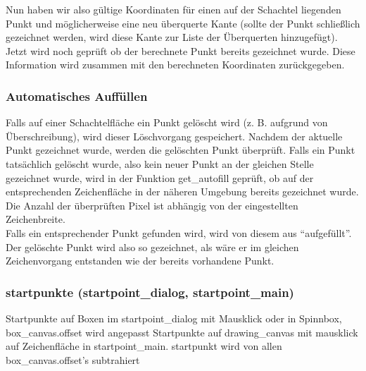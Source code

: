 Nun haben wir also gültige Koordinaten für einen auf der Schachtel liegenden Punkt und möglicherweise eine neu überquerte Kante (sollte der Punkt schließlich gezeichnet werden, wird diese Kante zur Liste der Überquerten hinzugefügt). Jetzt wird noch geprüft ob der berechnete Punkt bereits gezeichnet wurde. Diese Information wird zusammen mit den berechneten Koordinaten zurückgegeben.\\


\subsubsection{Automatisches Auffüllen}
\label{subsubsec:auffuellen}

Falls auf einer Schachtelfläche ein Punkt gelöscht wird (z. B. aufgrund von Überschreibung), wird dieser Löschvorgang gespeichert. Nachdem der aktuelle Punkt gezeichnet wurde, werden die gelöschten Punkt überprüft. Falls ein Punkt tatsächlich gelöscht wurde, also kein neuer Punkt an der gleichen Stelle gezeichnet wurde, wird in der Funktion get\_autofill geprüft, ob auf der entsprechenden Zeichenfläche in der näheren Umgebung bereits gezeichnet wurde. Die Anzahl der überprüften Pixel ist abhängig von der eingestellten Zeichenbreite.\\

Falls ein entsprechender Punkt gefunden wird, wird von diesem aus ``aufgefüllt''. Der gelöschte Punkt wird also so gezeichnet, als wäre er im gleichen Zeichenvorgang entstanden wie der bereits vorhandene Punkt.\\ 


\subsubsection{startpunkte (startpoint\_dialog, startpoint\_main)}
\label{subsubsec:startpunkte}

Startpunkte auf Boxen im startpoint\_dialog mit Mausklick oder in
Spinnbox, box\_canvas.offset wird angepasst Startpunkte auf drawing\_canvas
mit mausklick auf Zeichenfläche in startpoint\_main. startpunkt wird
von allen box\_canvas.offset's subtrahiert


